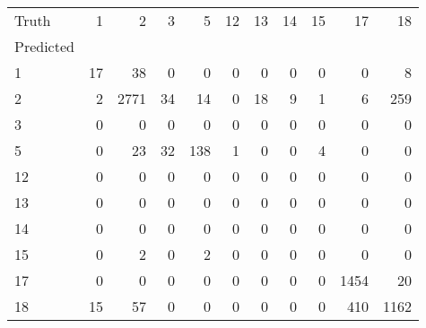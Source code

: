 \begin{tabular}{lrrrrrrrrrr}
\toprule
Truth & 1 & 2 & 3 & 5 & 12 & 13 & 14 & 15 & 17 & 18 \\
Predicted &  &  &  &  &  &  &  &  &  &  \\
\midrule
1 & 17 & 38 & 0 & 0 & 0 & 0 & 0 & 0 & 0 & 8 \\
2 & 2 & 2771 & 34 & 14 & 0 & 18 & 9 & 1 & 6 & 259 \\
3 & 0 & 0 & 0 & 0 & 0 & 0 & 0 & 0 & 0 & 0 \\
5 & 0 & 23 & 32 & 138 & 1 & 0 & 0 & 4 & 0 & 0 \\
12 & 0 & 0 & 0 & 0 & 0 & 0 & 0 & 0 & 0 & 0 \\
13 & 0 & 0 & 0 & 0 & 0 & 0 & 0 & 0 & 0 & 0 \\
14 & 0 & 0 & 0 & 0 & 0 & 0 & 0 & 0 & 0 & 0 \\
15 & 0 & 2 & 0 & 2 & 0 & 0 & 0 & 0 & 0 & 0 \\
17 & 0 & 0 & 0 & 0 & 0 & 0 & 0 & 0 & 1454 & 20 \\
18 & 15 & 57 & 0 & 0 & 0 & 0 & 0 & 0 & 410 & 1162 \\
\bottomrule
\end{tabular}

